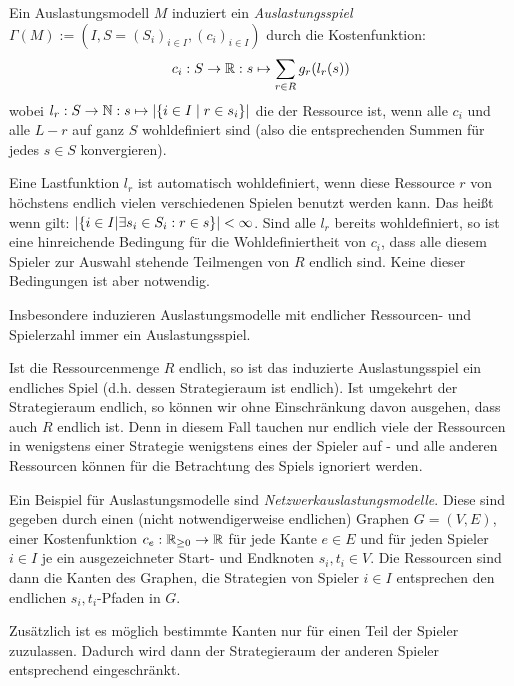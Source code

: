 \begin{defn}\label{def:Auslastungsspiel}
	Ein Auslastungsmodell $M$ induziert ein \emph{Auslastungsspiel} $\Gamma(M) := (I, S = (S_i)_{i\in I}, (c_i)_{i \in I})$ durch die Kostenfunktion:
	\[c_i: S \to \mathbb{R}: s \mapsto \sum_{r \in R} g_r(l_r(s)) \]
	wobei $l_r: S \to \mathbb{N}: s \mapsto \left|\{i\in I \mid r \in s_i\}\right|$ die der Ressource ist, wenn alle $c_i$ und alle $L-r$ auf ganz $S$ wohldefiniert sind (also die entsprechenden Summen für jedes $s \in S$ konvergieren).
\end{defn}

\begin{bem}
	Eine Lastfunktion $l_r$ ist automatisch wohldefiniert, wenn diese Ressource $r$ von höchstens endlich vielen verschiedenen Spielen benutzt werden kann. Das heißt wenn gilt: $\left|\left\{i \in I \middle| \exists s_i \in S_i: r \in s\right\}\right| < \infty$. Sind alle $l_r$ bereits wohldefiniert, so ist eine hinreichende Bedingung für die Wohldefiniertheit von $c_i$, dass alle diesem Spieler zur Auswahl stehende Teilmengen von $R$ endlich sind. Keine dieser Bedingungen ist aber notwendig.
	
	Insbesondere induzieren Auslastungsmodelle mit endlicher Ressourcen- und Spielerzahl immer ein Auslastungsspiel.
	
	Ist die Ressourcenmenge $R$ endlich, so ist das induzierte Auslastungsspiel ein endliches Spiel (d.h. dessen Strategieraum ist endlich). Ist umgekehrt der Strategieraum endlich, so können wir ohne Einschränkung davon ausgehen, dass auch $R$ endlich ist. Denn in diesem Fall tauchen nur endlich viele der Ressourcen in wenigstens einer Strategie wenigstens eines der Spieler auf - und alle anderen Ressourcen können für die Betrachtung des Spiels ignoriert werden.
\end{bem}

\begin{bsp}
	Ein Beispiel für Auslastungsmodelle sind \emph{Netzwerkauslastungsmodelle}. Diese sind gegeben durch einen (nicht notwendigerweise endlichen) Graphen $G=(V,E)$, einer Kostenfunktion $c_e: \mathbb{R}_{\geq 0} \to \mathbb{R}$ für jede Kante $e \in E$ und für jeden Spieler $i \in I$ je ein ausgezeichneter Start- und Endknoten $s_i, t_i \in V$. Die Ressourcen sind dann die Kanten des Graphen, die Strategien von Spieler $i \in I$ entsprechen den endlichen $s_i,t_i$-Pfaden in $G$. 
	
	Zusätzlich ist es möglich bestimmte Kanten nur für einen Teil der Spieler zuzulassen. Dadurch wird dann der Strategieraum der anderen Spieler entsprechend eingeschränkt.
\end{bsp}

